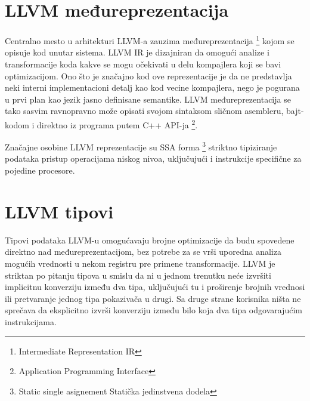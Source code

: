 \section{LLVM međureprezentacija}


Centralno mesto u arhitekturi LLVM-a\cite{aosa} zauzima međureprezentacija
\footnote{\eng Intermediate Representation \ndash IR} 
kojom se opisuje kod unutar sistema. 
LLVM IR je dizajniran da omogući analize i transformacije koda kakve se mogu očekivati u delu kompajlera koji se bavi optimizacijom. 
Ono što je značajno kod ove reprezentacije je da ne predstavlja neki interni implementacioni detalj kao kod vecine kompajlera, 
nego je pogurana u prvi plan kao jezik jasno definisane semantike. 
LLVM međureprezentacija se tako sasvim ravnopravno može opisati svojom sintaksom sličnom asembleru, 
bajt-kodom i direktno iz programa putem C++ API-ja
\footnote{\eng Application Programming Interface}.

Značajne osobine LLVM reprezentacije su 
SSA forma
\footnote{\skr \eng Static single asignement \ndash Statička jedinstvena dodela}
striktno tipiziranje podataka
pristup operacijama niskog nivoa, uključujući i instrukcije specifične za pojedine procesore.


\section{LLVM tipovi}

Tipovi podataka LLVM-u omogućavaju brojne optimizacije da budu spovedene direktno nad međureprezentacijom, 
bez potrebe za se vrši uporedna analiza mogućih vrednosti u nekom registru pre primene transformacije.
LLVM je striktan po pitanju tipova u smislu da ni u jednom trenutku neće izvršiti implicitnu konverziju između dva tipa, 
uključujući tu i proširenje brojnih vrednosi ili pretvaranje jednog tipa pokazivača u drugi. 
Sa druge strane korisnika ništa ne sprečava da eksplicitno izvrši konverziju između bilo koja dva tipa odgovarajućim instrukcijama.


